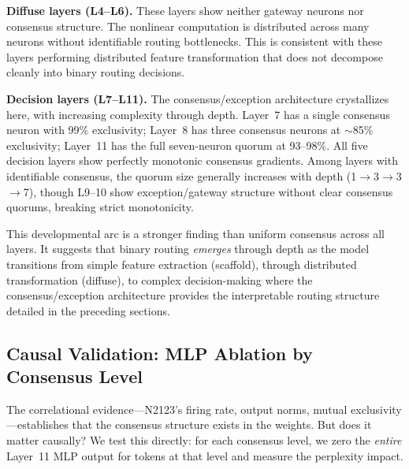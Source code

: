 \documentclass{article}
\begin{document}
\textbf{Diffuse layers (L4--L6).} These layers show neither gateway neurons nor consensus
structure. The nonlinear computation is distributed across many neurons without identifiable
routing bottlenecks. This is consistent with these layers performing distributed feature
transformation that does not decompose cleanly into binary routing decisions.

\textbf{Decision layers (L7--L11).} The consensus/exception architecture crystallizes here,
with increasing complexity through depth. Layer~7 has a single consensus neuron with 99\%
exclusivity; Layer~8 has three consensus neurons at $\sim$85\% exclusivity; Layer~11 has
the full seven-neuron quorum at 93--98\%. All five decision layers show perfectly monotonic
consensus gradients. Among layers with identifiable consensus, the quorum size generally
increases with depth (1$\to$3$\to$3$\to$7), though L9--10 show exception/gateway structure
without clear consensus quorums, breaking strict monotonicity.

This developmental arc is a stronger finding than uniform consensus across all layers.
It suggests that binary routing \emph{emerges} through depth as the model transitions from
simple feature extraction (scaffold), through distributed transformation (diffuse), to
complex decision-making where the consensus/exception architecture provides the interpretable
routing structure detailed in the preceding sections.

\subsection{Causal Validation: MLP Ablation by Consensus Level}
\label{sec:causal}

The correlational evidence---N2123's firing rate, output norms, mutual exclusivity---establishes
that the consensus structure exists in the weights. But does it matter causally? We test this
directly: for each consensus level, we zero the \emph{entire} Layer~11 MLP output for tokens
at that level and measure the perplexity impact.
\end{document}
